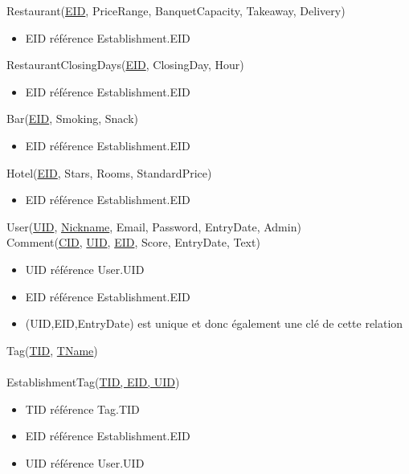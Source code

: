 \documentclass[11pt,a4paper]{report}
\begin{document}
Restaurant(\underline{EID}, PriceRange, BanquetCapacity, Takeaway, Delivery)
\begin{itemize}
\item EID référence Establishment.EID\\
\end{itemize} 

RestaurantClosingDays(\underline{EID}, ClosingDay, Hour)
\begin{itemize}
\item EID référence Establishment.EID\\
\end{itemize}

Bar(\underline{EID}, Smoking, Snack)
\begin{itemize}
\item EID référence Establishment.EID\\
\end{itemize}

Hotel(\underline{EID}, Stars, Rooms, StandardPrice)
\begin{itemize}
\item EID référence Establishment.EID\\
\end{itemize}

User(\underline{UID}, \underline{Nickname}, Email, Password, EntryDate, Admin)\\ 

Comment(\underline{CID}, \underline{UID}, \underline{EID}, Score, EntryDate, Text)
\begin{itemize}
\item UID référence User.UID
\item EID référence Establishment.EID
\item (UID,EID,EntryDate) est unique et donc également une clé de cette relation\\
\end{itemize}

Tag(\underline{TID}, \underline{TName})\\ \\

EstablishmentTag(\underline{TID, EID, UID})
\begin{itemize}
\item TID référence Tag.TID
\item EID référence Establishment.EID
\item UID référence User.UID\\
\end{itemize}
\end{document}
